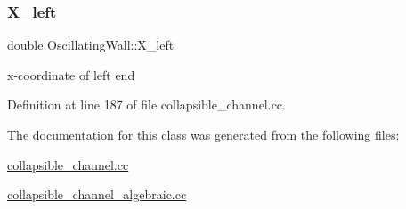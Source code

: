 \subsubsection{\texorpdfstring{X\+\_\+left}{X\_left}}
{\footnotesize\ttfamily double Oscillating\+Wall\+::\+X\+\_\+left\hspace{0.3cm}{\ttfamily [private]}}



x-\/coordinate of left end 



Definition at line 187 of file collapsible\+\_\+channel.\+cc.



The documentation for this class was generated from the following files\+:\begin{DoxyCompactItemize}
\item 
\hyperlink{collapsible__channel_8cc}{collapsible\+\_\+channel.\+cc}\item 
\hyperlink{collapsible__channel__algebraic_8cc}{collapsible\+\_\+channel\+\_\+algebraic.\+cc}\end{DoxyCompactItemize}
